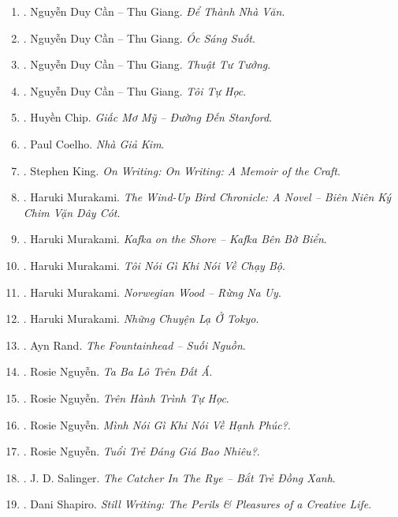 \documentclass{article}
\begin{document}
\begin{enumerate}
	\item \cite{Can_dtnv}. Nguyễn Duy Cần -- Thu Giang. {\it Để Thành Nhà Văn}.\hfill{\sf[done]}
	\item \cite{Can_oss}. Nguyễn Duy Cần -- Thu Giang. {\it Óc Sáng Suốt}.\hfill{\sf[reading]}
	\item \cite{Can_ttt}. Nguyễn Duy Cần -- Thu Giang. {\it Thuật Tư Tưởng}.\hfill{\sf[reading]}
	\item \cite{Can_tth}. Nguyễn Duy Cần -- Thu Giang. {\it Tôi Tự Học}.\hfill{\sf[reading]}
	\item \cite{Chip2018}. Huyền Chip. {\it Giấc Mơ Mỹ -- Đường Đến Stanford}.\hfill{\sf[done]}
	\item \cite{Coelho2023}. Paul Coelho. {\it Nhà Giả Kim}.\hfill{\sf[done]}
	\item \cite{King2000, King2010}. Stephen King. {\it On Writing: On Writing: A Memoir of the Craft}.\hfill{\sf[done]}
	\item \cite{Murakami_bird}. Haruki Murakami. {\it The Wind-Up Bird Chronicle: A Novel -- Biên Niên Ký Chim Vặn Dây Cót}.\hfill{\sf[done]}
	\item \cite{Murakami_Kafka}. Haruki Murakami. {\it Kafka on the Shore -- Kafka Bên Bờ Biển}.\hfill{\sf[done]}
	\item \cite{Murakami_run}. Haruki Murakami. {\it Tôi Nói Gì Khi Nói Về Chạy Bộ}.\hfill{\sf[done]}
	\item \cite{Murakami_Norwegian_wood}. Haruki Murakami. {\it Norwegian Wood -- Rừng Na Uy}.\hfill{\sf[done]}
	\item \cite{Murakami_Tokyo}. Haruki Murakami. {\it Những Chuyện Lạ Ở Tokyo}.\hfill{\sf[done]}
	\item \cite{Rand_fountainhead}. Ayn Rand. {\it The Fountainhead -- Suối Nguồn}.\hfill{\sf[done]}
	\item \cite{Rosie2021a}. Rosie Nguyễn. {\it Ta Ba Lô Trên Đất Á}.\hfill{\sf[done]}
	\item \cite{Rosie2021b}. Rosie Nguyễn. {\it Trên Hành Trình Tự Học}.\hfill{\sf[done]}
	\item \cite{Rosie2022a}. Rosie Nguyễn. {\it Mình Nói Gì Khi Nói Về Hạnh Phúc?}.\hfill{\sf[done]}
	\item \cite{Rosie2022b}. Rosie Nguyễn. {\it Tuổi Trẻ Đáng Giá Bao Nhiêu?}.\hfill{\sf[done]}
	\item \cite{Salinger_btdx}. J. D. Salinger. {\it The Catcher In The Rye -- Bắt Trẻ Đồng Xanh}.\hfill{\sf[done]}
	\item \cite{Shapiro2014}. Dani Shapiro. {\it Still Writing: The Perils \& Pleasures of a Creative Life}.\hfill{\sf[reading]}

\end{enumerate}
\end{document}
